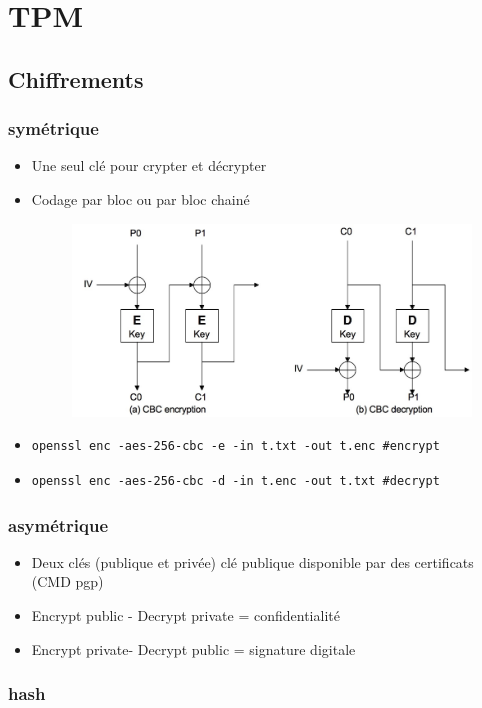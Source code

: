 \documentclass[resume]{subfiles}
\begin{document}
\section{TPM}

\subsection{Chiffrements}

\subsubsection{symétrique}

\begin{itemize}
\item Une seul clé pour crypter et décrypter
\item Codage par bloc ou par bloc chainé \begin{figure}[H]
    \centering
    \includegraphics[width=0.3\columnwidth]{Figures/TPM/CBC.png}
\end{figure}

\item \begin{lstlisting}[style=bash]
openssl enc -aes-256-cbc -e -in t.txt -out t.enc #encrypt
\end{lstlisting}
\item \begin{lstlisting}[style=bash]
openssl enc -aes-256-cbc -d -in t.enc -out t.txt #decrypt
\end{lstlisting}
\end{itemize}

\subsubsection{asymétrique}
\begin{itemize}
\item Deux clés (publique et privée) clé publique disponible par des certificats (CMD pgp)
\item Encrypt public - Decrypt private = confidentialité
\item Encrypt private- Decrypt public = signature digitale
\end{itemize}

\subsubsection{hash}
\end{document}
